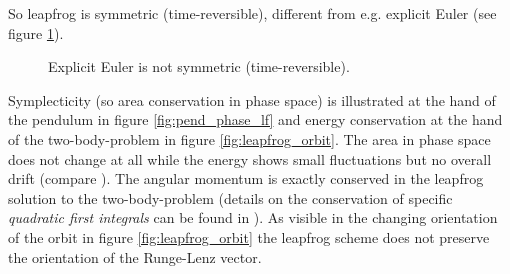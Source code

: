 
So leapfrog is symmetric (time-reversible), different from e.g. explicit Euler (see figure \ref{fig:euler_symm}).

\begin{figure}[!htb]
  \centering
  \hfill
  \caption{Explicit Euler is not symmetric (time-reversible).}
  \label{fig:euler_symm}
\end{figure}



Symplecticity (so area conservation in phase space) is illustrated at the hand of the pendulum in figure \ref{fig:pend_phase_lf} and energy conservation at the hand of the two-body-problem in figure \ref{fig:leapfrog_orbit}. The area in phase space does not change at all while the energy shows small fluctuations but no overall drift (compare \cite[theorem 5.5]{hairer03}). The angular momentum is exactly conserved in the leapfrog solution to the two-body-problem (details on the conservation of specific \textit{quadratic first integrals} can be found in \cite[theorem 3.5]{hairer03}). As visible in the changing orientation of the orbit in figure \ref{fig:leapfrog_orbit} the leapfrog scheme does not preserve the orientation of the Runge-Lenz vector.

